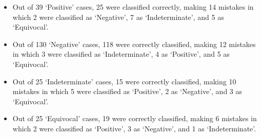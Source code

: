 \begin{itemize}[noitemsep]
    \item Out of 39 `Positive' cases, 25 were classified correctly, making 14 mistakes in which 2 were classified as `Negative', 7 as `Indeterminate', and 5 as `Equivocal'. 

    \item Out of 130 `Negative' cases, 118 were correctly classified, making 12 mistakes in which 3 were classified as `Indeterminate', 4 as `Positive', and 5 as `Equivocal'. 

    \item Out of 25 `Indeterminate' cases, 15 were correctly classified, making 10 mistakes in which 5 were classified as `Positive', 2 as `Negative', and 3 as `Equivocal'.
    
    \item Out of 25 `Equivocal' cases, 19 were correctly classified, making 6 mistakes in which 2 were classified as `Positive', 3 as `Negative', and 1 as `Indeterminate'.  
\end{itemize}






